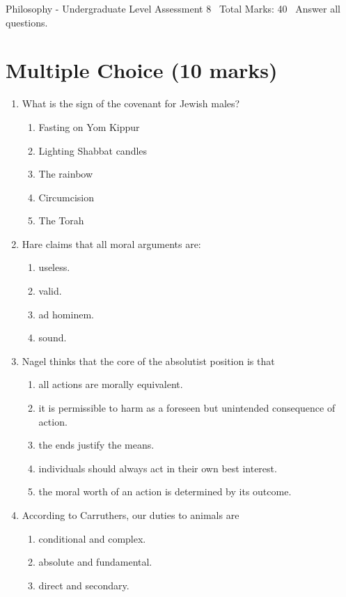 \documentclass[12pt]{article}
\begin{document}
\begin{center}
Philosophy - Undergraduate Level Assessment 8 \
Total Marks: 40 \
Answer all questions.
\end{center}

\section*{Multiple Choice (10 marks)}
\begin{enumerate}[label=\arabic*.]
\item What is the sign of the covenant for Jewish males?
\begin{enumerate}[label=(\alph*)]
    \item Fasting on Yom Kippur
    \item Lighting Shabbat candles
    \item The rainbow
    \item Circumcision
    \item The Torah
\end{enumerate}
\item Hare claims that all moral arguments are:
\begin{enumerate}[label=(\alph*)]
    \item useless.
    \item valid.
    \item ad hominem.
    \item sound.
\end{enumerate}
\item Nagel thinks that the core of the absolutist position is that
\begin{enumerate}[label=(\alph*)]
    \item all actions are morally equivalent.
    \item it is permissible to harm as a foreseen but unintended consequence of action.
    \item the ends justify the means.
    \item individuals should always act in their own best interest.
    \item the moral worth of an action is determined by its outcome.
\end{enumerate}
\item According to Carruthers, our duties to animals are
\begin{enumerate}[label=(\alph*)]
    \item conditional and complex.
    \item absolute and fundamental.
    \item direct and secondary.

\end{enumerate}
\end{enumerate}
\end{document}
